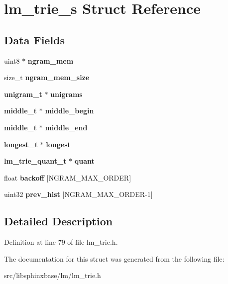 \section{lm\+\_\+trie\+\_\+s Struct Reference}
\label{structlm__trie__s}
\subsection*{Data Fields}
\begin{DoxyCompactItemize}
\item 
uint8 $\ast$ {\bfseries ngram\+\_\+mem}\label{structlm__trie__s_a58167a5c232538cebd3e083a097a9a1b}

\item 
size\+\_\+t {\bfseries ngram\+\_\+mem\+\_\+size}\label{structlm__trie__s_af256466f3eff8c3b665f10200815ba1d}

\item 
{\bf unigram\+\_\+t} $\ast$ {\bfseries unigrams}\label{structlm__trie__s_a22667bd186be6bf3804a3a597c96bd93}

\item 
{\bf middle\+\_\+t} $\ast$ {\bfseries middle\+\_\+begin}\label{structlm__trie__s_aa4a224213e7c1f5fcdb8b15169c237de}

\item 
{\bf middle\+\_\+t} $\ast$ {\bfseries middle\+\_\+end}\label{structlm__trie__s_a7f39ce792b398ba89e5db14a895189e9}

\item 
{\bf longest\+\_\+t} $\ast$ {\bfseries longest}\label{structlm__trie__s_ade570f476da0d4fb1d865a7eb4285a3b}

\item 
{\bf lm\+\_\+trie\+\_\+quant\+\_\+t} $\ast$ {\bfseries quant}\label{structlm__trie__s_a0a25fcb4269d21eba7596524b4f39bbd}

\item 
float {\bfseries backoff} [N\+G\+R\+A\+M\+\_\+\+M\+A\+X\+\_\+\+O\+R\+D\+E\+R]\label{structlm__trie__s_a467064aa205c77cd01be1d3a4fdd1e6d}

\item 
uint32 {\bfseries prev\+\_\+hist} [N\+G\+R\+A\+M\+\_\+\+M\+A\+X\+\_\+\+O\+R\+D\+E\+R-\/1]\label{structlm__trie__s_af5fc87e3db91813012f217c1eabf286c}

\end{DoxyCompactItemize}


\subsection{Detailed Description}


Definition at line 79 of file lm\+\_\+trie.\+h.



The documentation for this struct was generated from the following file\+:\begin{DoxyCompactItemize}
\item 
src/libsphinxbase/lm/lm\+\_\+trie.\+h\end{DoxyCompactItemize}
